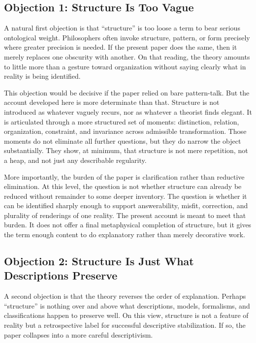 \documentclass[11pt]{article}
\begin{document}
\subsection{Objection 1: Structure Is Too Vague}

A natural first objection is that ``structure'' is too loose a term to bear serious ontological weight. Philosophers often invoke structure, pattern, or form precisely where greater precision is needed. If the present paper does the same, then it merely replaces one obscurity with another. On that reading, the theory amounts to little more than a gesture toward organization without saying clearly what in reality is being identified.

This objection would be decisive if the paper relied on bare pattern-talk. But the account developed here is more determinate than that. Structure is not introduced as whatever vaguely recurs, nor as whatever a theorist finds elegant. It is articulated through a more structured set of moments: distinction, relation, organization, constraint, and invariance across admissible transformation. Those moments do not eliminate all further questions, but they do narrow the object substantially. They show, at minimum, that structure is not mere repetition, not a heap, and not just any describable regularity.

More importantly, the burden of the paper is clarification rather than reductive elimination. At this level, the question is not whether structure can already be reduced without remainder to some deeper inventory. The question is whether it can be identified sharply enough to support answerability, misfit, correction, and plurality of renderings of one reality. The present account is meant to meet that burden. It does not offer a final metaphysical completion of structure, but it gives the term enough content to do explanatory rather than merely decorative work.

\subsection{Objection 2: Structure Is Just What Descriptions Preserve}

A second objection is that the theory reverses the order of explanation. Perhaps ``structure'' is nothing over and above what descriptions, models, formalisms, and classifications happen to preserve well. On this view, structure is not a feature of reality but a retrospective label for successful descriptive stabilization. If so, the paper collapses into a more careful descriptivism.
\end{document}
